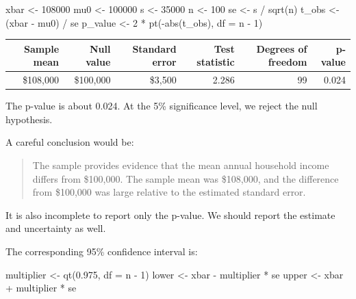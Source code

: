 \documentclass[
  letterpaper,
  DIV=11,
  numbers=noendperiod]{scrreprt}
\newenvironment{Shaded}{\begin{snugshade}}{\end{snugshade}}
\newcommand{\AttributeTok}[1]{\textcolor[rgb]{0.40,0.45,0.13}{#1}}
\newcommand{\DecValTok}[1]{\textcolor[rgb]{0.68,0.00,0.00}{#1}}
\newcommand{\FloatTok}[1]{\textcolor[rgb]{0.68,0.00,0.00}{#1}}
\newcommand{\FunctionTok}[1]{\textcolor[rgb]{0.28,0.35,0.67}{#1}}
\newcommand{\NormalTok}[1]{\textcolor[rgb]{0.00,0.23,0.31}{#1}}
\newcommand{\OtherTok}[1]{\textcolor[rgb]{0.00,0.23,0.31}{#1}}
\newcommand{\SpecialCharTok}[1]{\textcolor[rgb]{0.37,0.37,0.37}{#1}}
\begin{document}
\begin{Shaded}
\begin{Highlighting}[]
\NormalTok{xbar }\OtherTok{\textless{}{-}} \DecValTok{108000}
\NormalTok{mu0 }\OtherTok{\textless{}{-}} \DecValTok{100000}
\NormalTok{s }\OtherTok{\textless{}{-}} \DecValTok{35000}
\NormalTok{n }\OtherTok{\textless{}{-}} \DecValTok{100}
\NormalTok{se }\OtherTok{\textless{}{-}}\NormalTok{ s }\SpecialCharTok{/} \FunctionTok{sqrt}\NormalTok{(n)}
\NormalTok{t\_obs }\OtherTok{\textless{}{-}}\NormalTok{ (xbar }\SpecialCharTok{{-}}\NormalTok{ mu0) }\SpecialCharTok{/}\NormalTok{ se}
\NormalTok{p\_value }\OtherTok{\textless{}{-}} \DecValTok{2} \SpecialCharTok{*} \FunctionTok{pt}\NormalTok{(}\SpecialCharTok{{-}}\FunctionTok{abs}\NormalTok{(t\_obs), }\AttributeTok{df =}\NormalTok{ n }\SpecialCharTok{{-}} \DecValTok{1}\NormalTok{)}
\end{Highlighting}
\end{Shaded}

\begin{table}
\fontsize{12.0pt}{14.0pt}\selectfont
\begin{tabular*}{\linewidth}{@{\extracolsep{\fill}}rrrrrr}
\toprule
Sample mean & Null value & Standard error & Test statistic & Degrees of freedom & p-value \\ 
\midrule\addlinespace[2.5pt]
\$108,000 & \$100,000 & \$3,500 & 2.286 & 99 & 0.024 \\ 
\bottomrule
\end{tabular*}
\end{table}

The p-value is about 0.024. At the 5\% significance level, we reject the
null hypothesis.

A careful conclusion would be:

\begin{quote}
The sample provides evidence that the mean annual household income
differs from \$100,000. The sample mean was \$108,000, and the
difference from \$100,000 was large relative to the estimated standard
error.
\end{quote}

It is also incomplete to report only the p-value. We should report the
estimate and uncertainty as well.

The corresponding 95\% confidence interval is:

\begin{Shaded}
\begin{Highlighting}[]
\NormalTok{multiplier }\OtherTok{\textless{}{-}} \FunctionTok{qt}\NormalTok{(}\FloatTok{0.975}\NormalTok{, }\AttributeTok{df =}\NormalTok{ n }\SpecialCharTok{{-}} \DecValTok{1}\NormalTok{)}
\NormalTok{lower }\OtherTok{\textless{}{-}}\NormalTok{ xbar }\SpecialCharTok{{-}}\NormalTok{ multiplier }\SpecialCharTok{*}\NormalTok{ se}
\NormalTok{upper }\OtherTok{\textless{}{-}}\NormalTok{ xbar }\SpecialCharTok{+}\NormalTok{ multiplier }\SpecialCharTok{*}\NormalTok{ se}
\end{Highlighting}
\end{Shaded}
\end{document}
